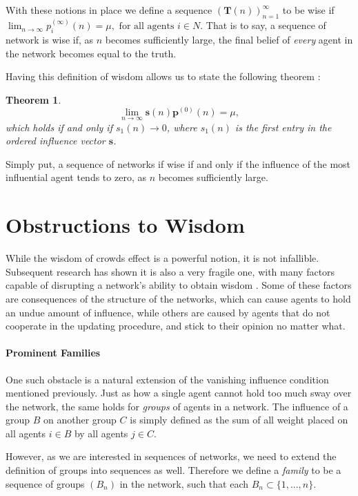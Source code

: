 \documentclass[a4paper, 12pt]{report}
\newtheorem{theorem}{Theorem}
\newcommand{\T}{\bm{T}}
\newcommand{\Soc}{(\T(n))^{\infty}_{n=1}}
\newcommand{\beli}[3][2]{p_{#2}^{(#3)}}
\begin{document}
With these notions in place we define a sequence $\Soc$ to be wise if $\lim_{n \to \infty} \beli{i}{\infty}(n) = \mu, \text{ for all agents $i \in N$}$. That is to say, a sequence of network is wise if, as $n$ becomes sufficiently large, the final belief of \emph{every} agent in the network becomes equal to the truth.


Having this definition of wisdom allows us to state the following theorem \parencite{golub2010naive}:
\begin{theorem}
\begin{equation*}
    \label{wisdom:influence}
    \lim_{n\to\infty} \textbf{s}(n)\bm{p}^{(0)}(n) = \mu,
\end{equation*}
which holds if and only if $s_{1}(n) \to 0$, where $s_1(n)$ is the first entry in the \emph{ordered} influence vector $\bm{s}$.
\end{theorem}
Simply put, a sequence of networks if wise if and only if the influence of the most influential agent tends to zero, as $n$ becomes sufficiently large.

\newpage

\section{Obstructions to Wisdom}
While the wisdom of crowds effect is a powerful notion, it is not infallible. Subsequent research has shown it is also a very fragile one, with many factors capable of disrupting a network's ability to obtain wisdom \parencite{amir2021robust}. Some of these factors are consequences of the structure of the networks, which can cause agents to hold an undue amount of influence, while others are caused by agents that do not cooperate in the updating procedure, and stick to their opinion no matter what.

\paragraph{Prominent Families}

One such obstacle is a natural extension of the vanishing influence condition mentioned previously. Just as how a single agent cannot hold too much sway over the network, the same holds for \emph{groups} of agents in a network. The influence of a group $B$ on another group $C$ is simply defined as the sum of all weight placed on all agents $i \in B$ by all agents $j \in C$. 

However, as we are interested in sequences of networks, we need to extend the definition of groups into sequences as well. Therefore we define a \emph{family} to be a sequence of groups $(B_n)$ in the network, such that each $B_n \subset \{1, ..., n\}$.
\end{document}
